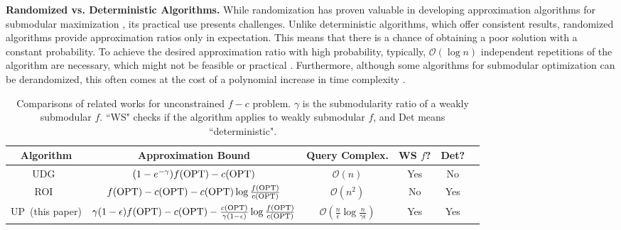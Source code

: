 \documentclass[10pt]{article} %
\theoremstyle{remark}
\newcommand{\OPT}{{\rm OPT}}
\begin{document}
\textbf{Randomized vs. Deterministic Algorithms.} 
While randomization has proven valuable in developing approximation algorithms for submodular maximization \cite{mirzasoleiman2015lazier, harshaw2019submodular}, its practical use presents challenges. Unlike deterministic algorithms, which offer consistent results, randomized algorithms provide approximation ratios only in expectation. This means that there is a chance of obtaining a poor solution with a constant probability. To achieve the desired approximation ratio with high probability, typically, $\mathcal{O}(\log n)$ independent repetitions of the algorithm are necessary, which might not be feasible or practical \cite{chen2023approximation}. Furthermore, although some algorithms for submodular optimization can be derandomized, this often comes at the cost of a polynomial increase in time complexity \cite{buchbinder2018deterministic}.


\begin{table}[t]
\caption{Comparisons of related works for unconstrained $f-c$ problem. $\gamma$ is the submodularity ratio of a weakly submodular $f$. ``WS" checks if the algorithm applies to weakly submodular $f$, and {\sc Det} means ``deterministic".}
\label{table:unconstrained}
\begin{center}
\begin{small}
\begin{sc}
\begin{tabular}{c c c c c l}
\toprule
Algorithm & Approximation Bound & Query Complex.  & WS $f$?   & Det? \\
\midrule
\textsc{UDG}~\cite{harshaw2019submodular} & $(1-e^{-\gamma})f(\OPT)-c(\OPT)$ & $\mathcal{O}(n)$ & Yes & No  \\ 
\textsc{ROI}~\cite{jin2021unconstrained} & $f(\OPT)-c(\OPT)-c(\OPT)\log \frac{f(\OPT)}{c(\OPT)}$ & $\mathcal{O}(n^2)$ & No & Yes  \\
\textsc{UP}~(this paper) & $\gamma(1-\epsilon)f(\OPT)-c(\OPT)- \frac{c(\OPT)}{\gamma(1-\epsilon)}\log \frac{f(\OPT)}{c(\OPT)}$ & $\mathcal{O}(\frac{n}{\epsilon}\log \frac{n}{\gamma \epsilon})$ & Yes & Yes \\ 
\bottomrule
\end{tabular}
\end{sc}
\end{small}
\end{center}
\end{table}
\end{document}
